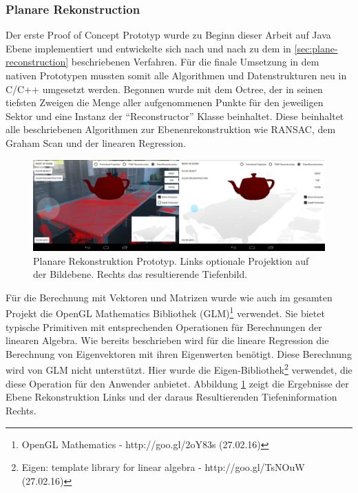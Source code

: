 \subsubsection*{Planare Rekonstruction}

Der erste Proof of Concept Prototyp wurde zu Beginn dieser Arbeit auf Java Ebene implementiert und entwickelte sich nach und nach zu dem in \ref{sec:plane-reconstruction} beschriebenen Verfahren. Für die finale Umsetzung in dem nativen Prototypen mussten somit alle Algorithmen und Datenstrukturen neu in C/C++ umgesetzt werden. Begonnen wurde mit dem Octree, der in seinen tiefsten Zweigen die Menge aller aufgenommenen Punkte für den jeweiligen Sektor und eine Instanz der \enquote{Reconstructor} Klasse beinhaltet. Diese beinhaltet alle beschriebenen Algorithmen zur Ebenenrekonstruktion wie RANSAC, dem Graham Scan und der linearen Regression. \\

\begin{figure}[h]
  \centering
	\includegraphics[width=1.0\textwidth]{content/images/implementation/plane-demo.png} 
  \caption{Planare Rekonstruktion Prototyp. Links optionale Projektion auf der Bildebene. Rechts das resultierende Tiefenbild.}
  \label{fig:plane-demo}
\end{figure}

Für die Berechnung mit Vektoren und Matrizen wurde wie auch im gesamten Projekt die OpenGL Mathematics Bibliothek (GLM)\footnote{OpenGL Mathematics - http://goo.gl/2oY83s (27.02.16)} verwendet. Sie bietet typische Primitiven mit entsprechenden Operationen für Berechnungen der linearen Algebra. Wie bereits beschrieben wird für die lineare Regression die Berechnung von Eigenvektoren mit ihren Eigenwerten benötigt. Diese Berechnung wird von GLM nicht unterstützt. Hier wurde die Eigen-Bibliothek\footnote{Eigen: template library for linear algebra - http://goo.gl/TsNOuW (27.02.16)} verwendet, die diese Operation für den Anwender anbietet. Abbildung \ref{fig:plane-demo} zeigt die Ergebnisse der Ebene Rekonstruktion Links und der daraus Resultierenden Tiefeninformation Rechts.


